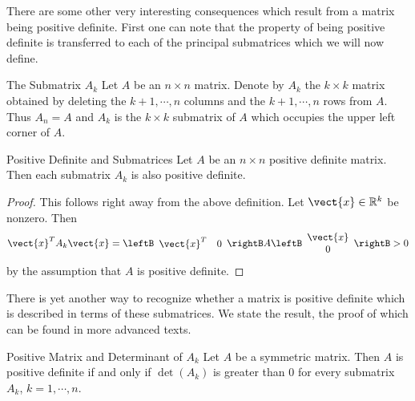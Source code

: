There are some other very interesting consequences which result from a
matrix being positive definite. First one can note that the property of
being positive definite is transferred to each of the principal submatrices which we will now define.

\begin{definition}{The Submatrix $A_k$}\label{def:submatrixAk}
Let $A$ be an $n\times n$ matrix. Denote by $A_{k}$ the $k\times k$ matrix
obtained by deleting the $k+1,\cdots ,n$ columns and the $k+1,\cdots ,n$
rows from $A.$ Thus $A_{n}=A$ and $A_{k}$ is the $k\times k$ submatrix of $A$
which occupies the upper left corner of $A.$
\end{definition}

\begin{lemma}{Positive Definite and Submatrices}\label{lem:positivematrixsubmatrix}
Let $A$ be an $n\times n$ positive definite matrix.  Then each submatrix $A_{k}$ is also positive definite.
\end{lemma}

\begin{proof}
This follows right away from the above definition. Let $\vect{x}\in \mathbb{R}^{k}$ be nonzero. Then 
\begin{equation*}
\vect{x}^{T}A_{k}\vect{x}=\leftB 
\begin{array}{cc}
\vect{x}^{T} & 0
\end{array}
\rightB A\leftB 
\begin{array}{c}
\vect{x} \\ 
0
\end{array}
\rightB >  0
\end{equation*}
by the assumption that $A$ is positive definite.
\end{proof}

There is yet another way to recognize whether a matrix is positive definite
which is described in terms of these submatrices. We state the result,  the proof
of which can be found in more advanced texts.

\begin{theorem}{Positive Matrix and Determinant of $A_k$}\label{thm:positivematrixdeterminantAk}   
Let $A$ be a symmetric matrix. Then $A$ is positive definite if
and only if $\det \left( A_{k}\right)$ is greater than $0$ for every submatrix $A_{k}$,  $k=1,\cdots ,n$. 
\end{theorem}

